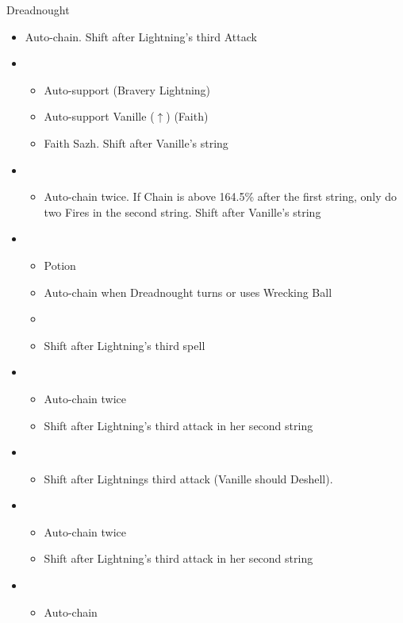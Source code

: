 \begin{paracol}{2}
\begin{battle}{Dreadnought}
\begin{itemize}
			\item Auto-chain. Shift after Lightning’s third Attack
			\item \sixth
			      \begin{itemize}
				      \item Auto-support (Bravery Lightning)
				      \item Auto-support Vanille ($\uparrow$) (Faith)
				      \item Faith Sazh. Shift after Vanille's string
			      \end{itemize}
			\item \fifth
			      \begin{itemize}
				      \item Auto-chain twice. If Chain is above 164.5\% after the first string, only do two Fires in the second string. Shift after Vanille's string
			      \end{itemize}
			\item \fourth
			      \begin{itemize}
				      \item Potion
				      \item Auto-chain when Dreadnought turns or uses Wrecking Ball
				      \item \stagger
				      \item Shift after Lightning's third spell
			      \end{itemize}
			\item \first
			      \begin{itemize}
				      \item Auto-chain twice
				      \item Shift after Lightning's third attack in her second string
			      \end{itemize}
			\item \second
			      \begin{itemize}
				      \item Shift after Lightnings third attack (Vanille should Deshell).
			      \end{itemize}
			\item \first
			      \begin{itemize}
				      \item Auto-chain twice
				      \item Shift after Lightning's third attack in her second string
			      \end{itemize}
			\item \third
			      \begin{itemize}
				      \item Auto-chain
			      \end{itemize}
		\end{itemize}
	\end{battle}


\end{paracol}
